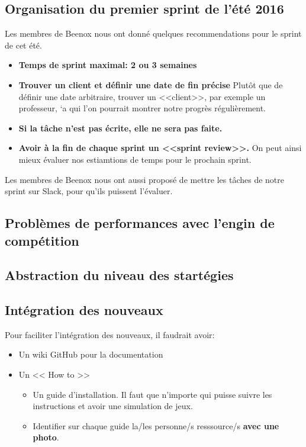 \documentclass[12pt,letterpaper,twoside]{article}
\begin{document}
\subsection*{Organisation du premier sprint de l'été 2016}
Les membres de Beenox nous ont donné quelques recommendations pour le sprint de cet été. 
\begin{itemize}
\item \textbf{Temps de sprint maximal: 2 ou 3 semaines}
\item \textbf{Trouver un client et définir une date de fin précise} 
Plut\^ot que de définir une date arbitraire, trouver un <<client>>, par exemple un professeur, `a qui l'on pourrait montrer notre progr\`es régulièrement.
\item \textbf{Si la tâche n'est pas écrite, elle ne sera pas faite.}
\item \textbf{Avoir à la fin de chaque sprint un <<sprint review>>.}
On peut ainsi mieux évaluer nos estiamtions de temps pour le prochain sprint.
\end{itemize}
Les membres de Beenox nous ont aussi proposé de mettre les tâches de notre sprint sur Slack, pour qu'ils puissent l'évaluer.

\subsection*{Probl\`emes de performances avec l'engin de compétition}

\subsection*{Abstraction du niveau des startégies}

\subsection*{Intégration des nouveaux}
Pour faciliter l'intégration des nouveaux, il faudrait avoir:
\begin{itemize}
\item Un wiki GitHub pour la documentation
\item Un << How to >>
\begin{itemize}
\item Un guide d'installation. 
Il faut que n'importe qui puisse suivre les instructions et avoir une simulation de jeux.
\item Identifier sur chaque guide la/les personne/s resssource/s \textbf{avec une photo}. 
\end{itemize}
\end{itemize}
\end{document}
